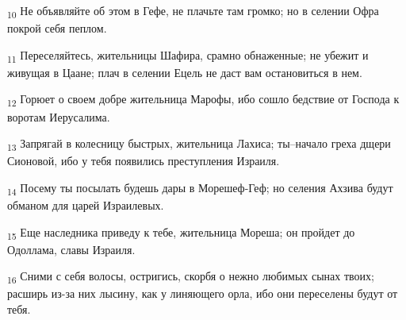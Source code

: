 \begin{tcolorbox}
\textsubscript{10} Не объявляйте об этом в Гефе, не плачьте там громко; но в селении Офра покрой себя пеплом.
\end{tcolorbox}
\begin{tcolorbox}
\textsubscript{11} Переселяйтесь, жительницы Шафира, срамно обнаженные; не убежит и живущая в Цаане; плач в селении Ецель не даст вам остановиться в нем.
\end{tcolorbox}
\begin{tcolorbox}
\textsubscript{12} Горюет о своем добре жительница Марофы, ибо сошло бедствие от Господа к воротам Иерусалима.
\end{tcolorbox}
\begin{tcolorbox}
\textsubscript{13} Запрягай в колесницу быстрых, жительница Лахиса; ты--начало греха дщери Сионовой, ибо у тебя появились преступления Израиля.
\end{tcolorbox}
\begin{tcolorbox}
\textsubscript{14} Посему ты посылать будешь дары в Морешеф-Геф; но селения Ахзива будут обманом для царей Израилевых.
\end{tcolorbox}
\begin{tcolorbox}
\textsubscript{15} Еще наследника приведу к тебе, жительница Мореша; он пройдет до Одоллама, славы Израиля.
\end{tcolorbox}
\begin{tcolorbox}
\textsubscript{16} Сними с себя волосы, остригись, скорбя о нежно любимых сынах твоих; расширь из-за них лысину, как у линяющего орла, ибо они переселены будут от тебя.
\end{tcolorbox}
